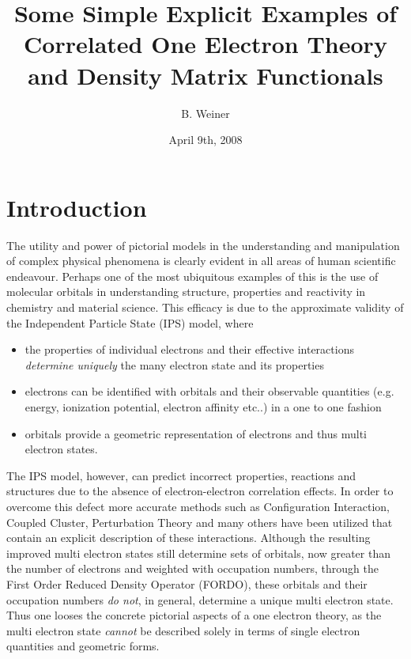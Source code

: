 \documentclass[aps,preprint]{revtex4}%
\begin{document}
\preprint{ }
\title{Some Simple Explicit Examples of Correlated One Electron Theory and Density
Matrix Functionals }
\author{B. Weiner}

\pacs{}
\date{April 9th, 2008}
\maketitle


\section{Introduction\label{Intro}}

The utility and power of pictorial models in the understanding and
manipulation of complex physical phenomena is clearly evident in all areas of
human scientific endeavour. Perhaps one of the most ubiquitous examples of
this is the use of molecular orbitals in understanding structure, properties
and reactivity in chemistry and material science. This efficacy is due to the
approximate validity of the Independent Particle State (IPS) model, where

\begin{itemize}
\item the properties of individual electrons and their effective interactions
\emph{determine uniquely} the many electron state and its properties

\item electrons can be identified with orbitals and their observable
quantities (e.g. energy, ionization potential, electron affinity etc..) in a
one to one fashion

\item orbitals provide a geometric representation of electrons and thus multi
electron states.
\end{itemize}

The IPS model, however, can predict incorrect properties, reactions and
structures due to the absence of electron-electron correlation effects. In
order to overcome this defect more accurate methods such as Configuration
Interaction, Coupled Cluster, Perturbation Theory and many others have been
utilized that contain an explicit description of these interactions. Although
the resulting improved multi electron states still determine sets of orbitals,
now greater than the number of electrons and weighted with occupation numbers,
through the First Order Reduced Density Operator (FORDO), these orbitals and
their occupation numbers \emph{do not}, in general, determine a unique multi
electron state. Thus one looses the concrete pictorial aspects of a one
electron theory, as the multi electron state \emph{cannot} be described solely
in terms of single electron quantities and geometric forms.
\end{document}
